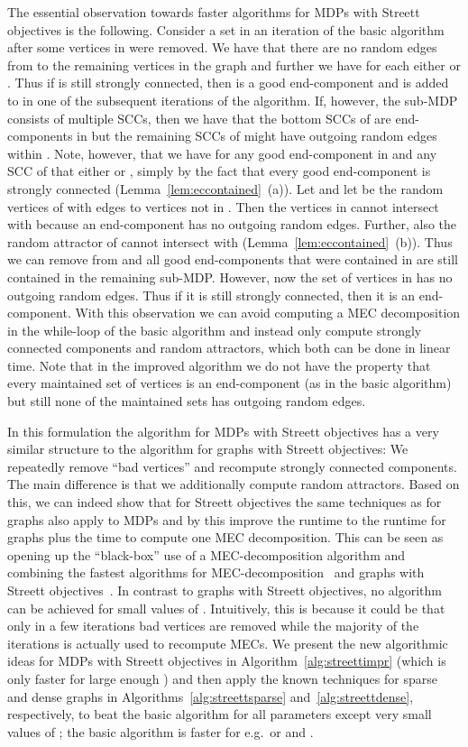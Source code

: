 \documentclass[11pt,letterpaper]{article}
\newcommand{\lu}{\textup{(}}
\newcommand{\ru}{\textup{)}\xspace}
\newcommand{\upbr}[1]{\lu #1\ru}
\begin{document}
The essential observation towards faster algorithms for MDPs with Streett objectives
is the following.
Consider a set  in an iteration of the basic algorithm after 
some vertices in  were removed.
We have that there are no random edges from  to the remaining vertices
in the graph and further we have for each  either  or . Thus if  is still 
strongly connected, then  is a good
end-component and is added to  in one of the subsequent iterations
of the algorithm. If, however, the sub-MDP  consists of multiple SCCs, 
then we have that the bottom SCCs of  are end-components in  
but the remaining SCCs of  might have outgoing random edges within
. Note, however, that we have for any good end-component 
in  and any SCC  of  that either  
or , simply by the fact that every good end-component
is strongly connected (Lemma~\ref{lem:eccontained}~\upbr{a}). Let  and let 
 be the random vertices of  with edges to 
vertices not in . Then the vertices in  cannot intersect with 
because an end-component has no outgoing random edges. Further, also the 
random attractor of  cannot intersect with  (Lemma~\ref{lem:eccontained}~\upbr{b}). Thus we can 
remove  from  and all good end-components that were contained
in  are still contained in the remaining sub-MDP. However, now the 
set of vertices in  has no outgoing random edges.
Thus if it is still strongly connected, then it is an end-component.
With this observation we can avoid computing a MEC decomposition in the 
while-loop of the basic algorithm and instead only compute strongly connected 
components and random attractors, which both can be done in linear time.
Note that in the improved algorithm we do not have the property that every 
maintained set of vertices is an end-component (as in the basic algorithm) but
still none of the maintained sets has outgoing random edges. 

In this formulation the algorithm for MDPs with Streett objectives has a very 
similar structure to the algorithm for graphs with Streett objectives: 
We repeatedly remove ``bad vertices'' and recompute strongly connected components.
The main difference is that we additionally compute random attractors.
Based on this, we can indeed show that for Streett objectives 
the same techniques as for graphs also apply to MDPs and by this improve the 
runtime to the runtime for graphs plus the time to compute one MEC decomposition.
This can be seen as opening up the ``black-box''
use of a MEC-decomposition algorithm and combining the fastest algorithms for 
MEC-decomposition~\cite{ChatterjeeH11,ChatterjeeH14} and graphs with Streett 
objectives~\cite{HenzingerT96,ChatterjeeHL15}.
In contrast to graphs with Streett objectives, no 
algorithm can be achieved for small values of . Intuitively, this is because
it could be that only in a few iterations bad vertices are removed while
the majority of the iterations is actually used to recompute MECs.
We present the new algorithmic ideas for MDPs with Streett objectives in 
Algorithm~\ref{alg:streettimpr} (which is only faster for large enough )
and then apply the known techniques for sparse and dense graphs in 
Algorithms~\ref{alg:streettsparse} and~\ref{alg:streettdense},
respectively, to beat the basic algorithm for all parameters except very small 
values of ; the basic algorithm is faster for e.g.\  or  and .
\end{document}
